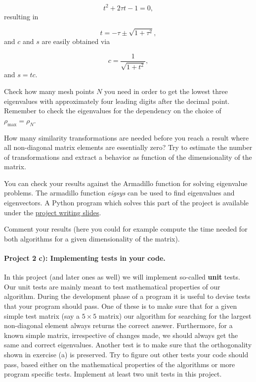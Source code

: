 \documentclass[%
oneside,                 %
final,                   %
10pt]{article}
\begin{document}
\begin{equation*}
t^2+2\tau t-1= 0,
\end{equation*}
resulting in

\begin{equation*}
  t = -\tau \pm \sqrt{1+\tau^2},
\end{equation*}
and $c$ and $s$ are easily obtained via

\begin{equation*}
   c = \frac{1}{\sqrt{1+t^2}},
\end{equation*}
and $s=tc$.  

Check how many mesh points $N$ you need in order to get the lowest three eigenvalues 
with approximately four leading digits after the decimal point. Remember to check the eigenvalues for 
the dependency on the choice of $\rho_{\mathrm{max}}=\rho_N$.

How many similarity transformations are needed before you reach a 
result where all non-diagonal matrix elements are essentially zero?
Try to estimate the number of transformations and extract a behavior as function
of the dimensionality of the matrix.

You can check your results against the Armadillo function for solving 
eigenvalue problems. The armadillo function \emph{eigsys} can be used to find eigenvalues and eigenvectors.
A Python program which solves this part of the project is available under the \href{{http://compphysics.github.io/ComputationalPhysics/doc/pub/projectwriting/html/projectwriting.html}}{project writing slides}. 



Comment your results (here you could for example compute the time needed for 
both algorithms for a given dimensionality of the matrix).  


\paragraph{Project 2 c): Implementing tests in your code.}
In this project (and later ones as well) we will implement so-called \textbf{unit} tests. Our unit tests are mainly meant to test mathematical properties of our algorithm. During the development phase of a program it is useful to devise tests that your program should pass. One of these is to make sure that for a given simple test matrix (say a $5\times 5$ matrix) our algorithm for searching for the largest non-diagonal element always returns the correct answer. Furthermore, for a known simple matrix, irrespective of changes made, we should always get the same and correct eigenvalues. Another test is to make sure that the orthogonality shown in exercise (a) is preserved. Try to figure out other tests your code should pass, based either on the mathematical properties of the algorithms or more program specific tests. Implement at least two unit tests in this project. 
\end{document}
